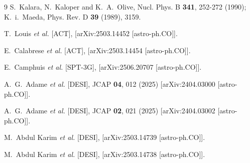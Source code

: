 \documentclass[aps,prev,twocolumn,preprintnumbers,floatfix,nofootinbib]{revtex4-1}
\begin{document}
\begin{thebibliography}{9}
S.~Kalara, N.~Kaloper and K.~A.~Olive,
Nucl. Phys. B \textbf{341}, 252-272 (1990);
K.~i.~Maeda,
Phys. Rev. D \textbf{39} (1989), 3159.


T.~Louis \textit{et al.} [ACT],
[arXiv:2503.14452 [astro-ph.CO]].

E.~Calabrese \textit{et al.} [ACT],
[arXiv:2503.14454 [astro-ph.CO]].

E.~Camphuis \textit{et al.} [SPT-3G],
[arXiv:2506.20707 [astro-ph.CO]].

A.~G.~Adame \textit{et al.} [DESI],
JCAP \textbf{04}, 012 (2025)
[arXiv:2404.03000 [astro-ph.CO]].

A.~G.~Adame \textit{et al.} [DESI],
JCAP \textbf{02}, 021 (2025)
[arXiv:2404.03002 [astro-ph.CO]].

M.~Abdul Karim \textit{et al.} [DESI],
[arXiv:2503.14739 [astro-ph.CO]].

M.~Abdul Karim \textit{et al.} [DESI],
[arXiv:2503.14738 [astro-ph.CO]].


\end{thebibliography}
\end{document}
